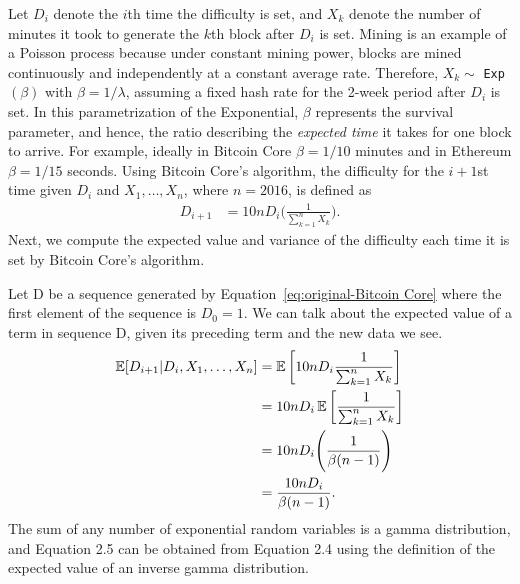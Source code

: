 Let $D_i$ denote the $i$th time the difficulty is set, and $X_k$ denote the number of minutes it took to generate the $k$th block after $D_i$ is set. 
Mining is an example of a Poisson process because under constant
mining power, blocks are mined continuously and independently at a
constant average rate.  Therefore, $X_k \sim$ \texttt{Exp}$(\beta)$ with $\beta = 1/\lambda$, assuming a fixed hash rate for the 2-week period after $D_i$ is set. In this parametrization of the Exponential, $\beta$ represents the survival parameter, and hence, the ratio describing the {\em expected time} it takes for one block to arrive. For example, ideally in Bitcoin Core $\beta=1/10$ minutes and in Ethereum $\beta=1/15$ seconds. Using Bitcoin Core's algorithm, the difficulty for the $i+1$st time given $D_i$ and $X_1, \dots, X_n$, where $n=2016$, is defined as
\begin{align}
D_{i+1} &= 10nD_i \Bigg(\frac{1}{\sum_{k=1}^{n} X_k}\Bigg).\label{eq:original-Bitcoin Core}
\end{align}
Next, we compute the expected value and variance of the difficulty each time it is set by Bitcoin Core's algorithm.

Let D be a sequence generated by Equation~\ref{eq:original-Bitcoin Core} where the first element of the sequence is $D_0 = 1$. We can talk about the expected value of a term in sequence D, given its preceding term and the new data we see. 
\begin{align}
\operatorname{\mathbb{E}}[D_{i+1} | D_{i}, X_1, \dots, X_{n}] &= \operatorname{\mathbb{E}}\bigg[10n D_i \frac{1}{\sum_{k=1}^{n} X_k}\bigg] \\
&= 10n D_i \operatorname{\mathbb{E}}\bigg[\frac{1}{\sum_{k=1}^{n} X_k}\bigg] \\
&= 10n D_i \Bigg(\frac{1}{\beta(n-1)}\Bigg) \\
&= \frac{10n D_i}{\beta(n-1)}.
\end{align}
The sum of any number of exponential random variables is a gamma distribution, and Equation 2.5 can be obtained from Equation 2.4 using the definition of the expected value of an inverse gamma distribution.

